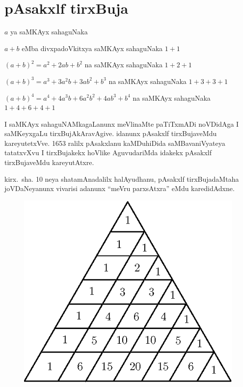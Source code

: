 \chapter{pAsakxlf tirxBuja}

\vskip -25pt
\noindent
$a$ ya saMKAyx sahaguNaka 

\noindent
$a+b$ eMba divxpadoVkitxya saMKAyx sahaguNaka \quad $1+1$

\noindent
$(a+b)^2=a^2+2ab+b^2$ na saMKAyx sahaguNaka \quad $1+2+1$

\noindent
$(a+b)^3=a^3+3a^2b+3ab^2+b^3$ na saMKAyx sahaguNaka \quad $1+3+3+1$

\noindent
$(a+b)^4=a^4+4a^3b+6a^2b^2+4ab^3+b^4$ na saMKAyx sahaguNaka \quad $1+4+6+4+1$

I saMKAyx sahaguNAMkagaLanunx meVlinaMte paTiTxmADi noVDidAga I saMKeyxgaLu tirxBujAkAravAgive. idanunx pAsakxlf tirxBujaveMdu kareyutetxVve. {\rm 1653} ralilx pAsakxlanu kaMDuhiDida saMBavaniVyateya tatatxvXvu I tirxBujakekx hoVlike AguvudariMda idakekx pAsakxlf tirxBujaveMdu kareyutAtxre.

kirx.~sha. {\rm 10} neya shatamAnadalilx halAyudhanu, pAsakxlf tirxBujadaMtaha joVDaNe\-yanunx vivarisi adanunx ``meVru parxsAtxra'' eMdu karedidAdxne.
\hspace{2.5cm}
\begin{figure}[H]
\centering
\includegraphics[scale=.7]{src/figures/m_151.eps}
\end{figure}
\centerline{}

